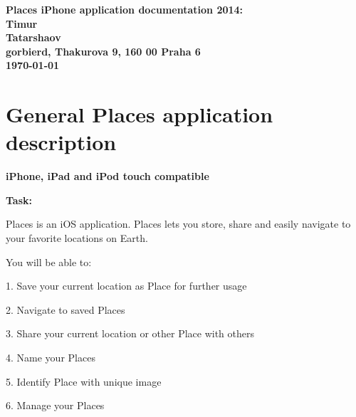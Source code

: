 \documentclass[12pt]{article}
\begin{document}








\begin{center}
\bf Places iPhone application documentation 2014: \\[5mm]

       Timur\\
       Tatarshaov\\[2mm]
gorbierd, Thakurova 9, 160 00 Praha 6\\[2mm]
\today
\end{center}








\section{General Places application description}


\textbf{iPhone, iPad and iPod touch compatible}      
 
       
       \textbf{Task:}


Places is an iOS application. Places lets you store, share and easily navigate to your favorite locations on Earth.
       

       
    You will be able to:

1.   Save your current location as Place for further usage

2.   Navigate to saved Places

3.   Share your current  location or other Place with others

4.   Name your Places

5. Identify Place with unique image

6.   Manage your Places
       




\clearpage
\end{document}
